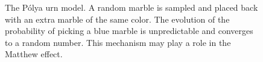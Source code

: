 \documentclass[
  a4paper,
  DIV=11,
  numbers=noendperiod,
  oneside]{scrreprt}
\begin{document}
\begin{figure}


\caption{\label{fig-ch4n-img12-old-60}The Pólya urn model. A random
marble is sampled and placed back with an extra marble of the same
color. The evolution of the probability of picking a blue marble is
unpredictable and converges to a random number. This mechanism may play
a role in the Matthew effect.}

\end{figure}%
\end{document}
